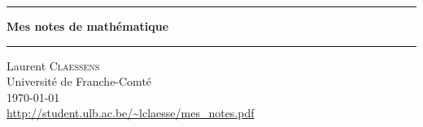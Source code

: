 \thispagestyle{empty}
\begin{center}
  \begin{minipage}{15cm}
    \hrule\par
    \vspace{2mm}
    \begin{center}
    \Huge \bfseries Mes notes de mathématique \par
    \end{center}
    \hrule\par
  \end{minipage}
\end{center}

\vspace{2cm}

\begin{center}
    Laurent \textsc{Claessens}\\
    Université de Franche-Comté\\
    \today\\
    \url{http://student.ulb.ac.be/~lclaesse/mes_notes.pdf}\\
\end{center}

\vfill

